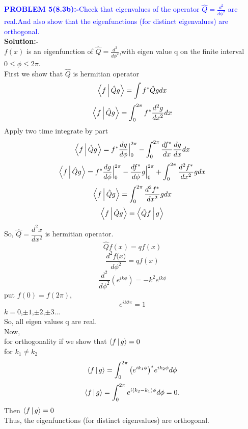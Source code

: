  \textcolor{blue}{ \textbf{PROBLEM 5(8.3b):-}Check that eigenvalues of the  operator $\hat{Q}=\frac{d^2}{d{\phi}^2}$ are real.And also show that the eigenfunctions (for distinct eigenvalues) are orthogonal.}\\
 \textbf{Solution:-}\\
 \hspace*{2cm}$f(x)$  is an eigenfunction of $\hat{Q}=\frac{d^2}{d{\phi}^2}$,with eigen value q on the finite interval $0 \leq \phi\leq 2\pi$.\\
 First we show that $\hat{Q}$ is hermitian operator\\
$$\Braket{f|\hat{Q}g}=\int{f^{*}\hat{Q}gdx}$$
$$\Braket{f|\hat{Q}g}=\int_{0}^{2\pi}{f^{*}\frac{d^2{g}}{dx^2}dx}$$
Apply  two time integrate by part
$$\Braket{f|\hat{Q}g}=f^{*}\frac{dg}{d\phi}\Big|_{0}^{2\pi}-\int_{0}^{2\pi}{\frac{df^{*}}{dx}\frac{d{g}}{dx}dx}$$
$$\Braket{f|\hat{Q}g}=f^{*}\frac{dg}{d\phi}\Big|_{0}^{2\pi}-\frac{df^{*}}{d\phi}g\Big|_{0}^{2\pi}+\int_{0}^{2\pi}{\frac{d^2{f^{*}}}{dx^2}{g}dx}$$
$$\Braket{f|\hat{Q}g}=\int_{0}^{2\pi}{\frac{d^2{f^{*}}}{dx^2}{g}dx}$$
$$\Braket{f|\hat{Q}g}=\Braket{\hat{Q}f|g}$$
So, $\hat{Q}=\dfrac{d^2x}{dx^2}$ is hermitian operator.\\
$$\hat{Q}f(x)=qf(x)$$
$$\frac{d^2{f(x})}{d{\phi}^2}=qf(x)$$
$$\frac{d^2}{{d\phi}^2}(e^{ik\phi})=-k^2e^{ik\phi}$$
put $f(0)=f(2\pi)$,\\
$$e^{ik{2\pi}}=1$$
 $k=0$,$\pm1$,$\pm2$,$\pm3\hdots$\\
So, all eigen values q are real.\\
 Now,\\ 
  for orthogonality if we show that $\Braket{f|g}=0$\\
  for $k_{1}\neq k_{2}$
  $$\Braket{f|g}=\int_{0}^{2\pi}\big(e^{ik_{1}\phi}\big)^{*}e^{ik_{2}\phi}d\phi$$
  $$\Braket{f|g}=\int_{0}^{2\pi}e^{i(k_{2}-k_{1})\phi}d\phi=0.$$
  Then $\Braket{f|g}=0$\\
  Thus, the eigenfunctions (for distinct eigenvalues) are orthogonal.\\
  \newpage
